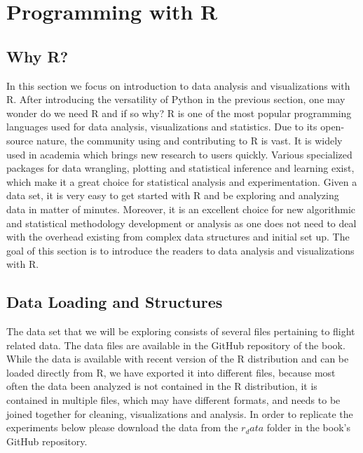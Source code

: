 \section{Programming with R}

\subsection{Why R?}

In this section we focus on introduction to data analysis and visualizations with R.
After introducing the versatility of Python in the previous section, one may wonder do we need R and if so why?
R is one of the most popular programming languages used for data analysis, visualizations and statistics.
Due to its open-source nature, the community using and contributing to R is vast.
It is widely used in academia which brings new research to users quickly. Various specialized packages for data wrangling, plotting and statistical inference and learning exist, which make it a great choice for statistical analysis and experimentation.
Given a data set, it is very easy to get started with R and be exploring and analyzing data in matter of minutes.
Moreover, it is an excellent choice for new algorithmic and statistical methodology development or analysis as one does not need to deal with the overhead existing from complex data structures and initial set up.
The goal of this section is to introduce the readers to data analysis and visualizations with R.

\subsection{Data Loading and Structures}
The data set that we will be exploring consists of several files pertaining to flight related data.
The data files are available in the GitHub repository of the book.
While the data is available with recent version of the R distribution and can be loaded directly from R, we have exported it into different files, because most often the data been analyzed is not contained in the R distribution, it is contained in multiple files, which may have different formats, and needs to be joined together for cleaning, visualizations and analysis. In order to replicate the experiments below please download the data from the $r_data$ folder in the book's GitHub repository.

